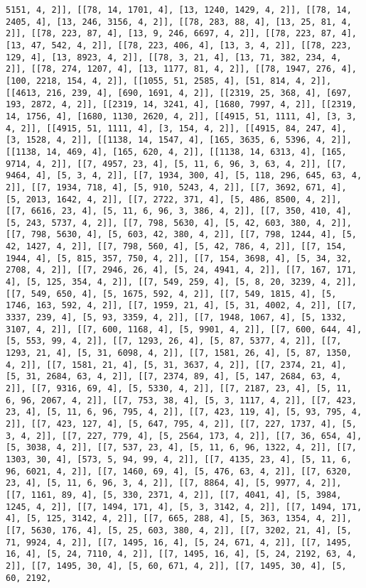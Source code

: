 \documentclass[12pt,fleqn]{article}\usepackage{../../common}
\begin{document}
\begin{verbatim}
5151, 4, 2]], [[78, 14, 1701, 4], [13, 1240, 1429, 4, 2]], [[78, 14, 2405, 4], [13, 246, 3156, 4, 2]], [[78, 283, 88, 4], [13, 25, 81, 4, 2]], [[78, 223, 87, 4], [13, 9, 246, 6697, 4, 2]], [[78, 223, 87, 4], [13, 47, 542, 4, 2]], [[78, 223, 406, 4], [13, 3, 4, 2]], [[78, 223, 129, 4], [13, 8923, 4, 2]], [[78, 3, 21, 4], [13, 71, 382, 234, 4, 2]], [[78, 274, 1207, 4], [13, 1177, 81, 4, 2]], [[78, 1947, 276, 4], [100, 2218, 154, 4, 2]], [[1055, 51, 2585, 4], [51, 814, 4, 2]], [[4613, 216, 239, 4], [690, 1691, 4, 2]], [[2319, 25, 368, 4], [697, 193, 2872, 4, 2]], [[2319, 14, 3241, 4], [1680, 7997, 4, 2]], [[2319, 14, 1756, 4], [1680, 1130, 2620, 4, 2]], [[4915, 51, 1111, 4], [3, 3, 4, 2]], [[4915, 51, 1111, 4], [3, 154, 4, 2]], [[4915, 84, 247, 4], [3, 1528, 4, 2]], [[1138, 14, 1547, 4], [165, 3635, 6, 5396, 4, 2]], [[1138, 14, 469, 4], [165, 620, 4, 2]], [[1138, 14, 6313, 4], [165, 9714, 4, 2]], [[7, 4957, 23, 4], [5, 11, 6, 96, 3, 63, 4, 2]], [[7, 9464, 4], [5, 3, 4, 2]], [[7, 1934, 300, 4], [5, 118, 296, 645, 63, 4, 2]], [[7, 1934, 718, 4], [5, 910, 5243, 4, 2]], [[7, 3692, 671, 4], [5, 2013, 1642, 4, 2]], [[7, 2722, 371, 4], [5, 486, 8500, 4, 2]], [[7, 6616, 23, 4], [5, 11, 6, 96, 3, 386, 4, 2]], [[7, 350, 410, 4], [5, 243, 5737, 4, 2]], [[7, 798, 5630, 4], [5, 42, 603, 380, 4, 2]], [[7, 798, 5630, 4], [5, 603, 42, 380, 4, 2]], [[7, 798, 1244, 4], [5, 42, 1427, 4, 2]], [[7, 798, 560, 4], [5, 42, 786, 4, 2]], [[7, 154, 1944, 4], [5, 815, 357, 750, 4, 2]], [[7, 154, 3698, 4], [5, 34, 32, 2708, 4, 2]], [[7, 2946, 26, 4], [5, 24, 4941, 4, 2]], [[7, 167, 171, 4], [5, 125, 354, 4, 2]], [[7, 549, 259, 4], [5, 8, 20, 3239, 4, 2]], [[7, 549, 650, 4], [5, 1675, 592, 4, 2]], [[7, 549, 1815, 4], [5, 1746, 163, 592, 4, 2]], [[7, 1959, 21, 4], [5, 31, 4002, 4, 2]], [[7, 3337, 239, 4], [5, 93, 3359, 4, 2]], [[7, 1948, 1067, 4], [5, 1332, 3107, 4, 2]], [[7, 600, 1168, 4], [5, 9901, 4, 2]], [[7, 600, 644, 4], [5, 553, 99, 4, 2]], [[7, 1293, 26, 4], [5, 87, 5377, 4, 2]], [[7, 1293, 21, 4], [5, 31, 6098, 4, 2]], [[7, 1581, 26, 4], [5, 87, 1350, 4, 2]], [[7, 1581, 21, 4], [5, 31, 3637, 4, 2]], [[7, 2374, 21, 4], [5, 31, 2684, 63, 4, 2]], [[7, 2374, 89, 4], [5, 147, 2684, 63, 4, 2]], [[7, 9316, 69, 4], [5, 5330, 4, 2]], [[7, 2187, 23, 4], [5, 11, 6, 96, 2067, 4, 2]], [[7, 753, 38, 4], [5, 3, 1117, 4, 2]], [[7, 423, 23, 4], [5, 11, 6, 96, 795, 4, 2]], [[7, 423, 119, 4], [5, 93, 795, 4, 2]], [[7, 423, 127, 4], [5, 647, 795, 4, 2]], [[7, 227, 1737, 4], [5, 3, 4, 2]], [[7, 227, 779, 4], [5, 2564, 173, 4, 2]], [[7, 36, 654, 4], [5, 3038, 4, 2]], [[7, 537, 23, 4], [5, 11, 6, 96, 1322, 4, 2]], [[7, 1303, 30, 4], [573, 5, 94, 99, 4, 2]], [[7, 4135, 23, 4], [5, 11, 6, 96, 6021, 4, 2]], [[7, 1460, 69, 4], [5, 476, 63, 4, 2]], [[7, 6320, 23, 4], [5, 11, 6, 96, 3, 4, 2]], [[7, 8864, 4], [5, 9977, 4, 2]], [[7, 1161, 89, 4], [5, 330, 2371, 4, 2]], [[7, 4041, 4], [5, 3984, 1245, 4, 2]], [[7, 1494, 171, 4], [5, 3, 3142, 4, 2]], [[7, 1494, 171, 4], [5, 125, 3142, 4, 2]], [[7, 665, 288, 4], [5, 363, 1354, 4, 2]], [[7, 5630, 176, 4], [5, 25, 603, 380, 4, 2]], [[7, 3202, 21, 4], [5, 71, 9924, 4, 2]], [[7, 1495, 16, 4], [5, 24, 671, 4, 2]], [[7, 1495, 16, 4], [5, 24, 7110, 4, 2]], [[7, 1495, 16, 4], [5, 24, 2192, 63, 4, 2]], [[7, 1495, 30, 4], [5, 60, 671, 4, 2]], [[7, 1495, 30, 4], [5, 60, 2192, 
\end{verbatim}
\end{document}
